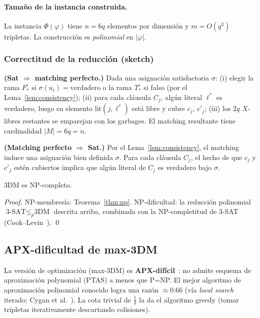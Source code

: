 \paragraph{Tamaño de la instancia construida.}
La instancia $\Phi(\varphi)$ tiene $n=6q$ elementos por dimensión y
$m=O(q^3)$ tripletas.  La construcción es \emph{polinomial} en $|\varphi|$.

\subsubsection{Correctitud de la reducción (sketch)}
\label{sec:complejidad:correctitud}

\textbf{(Sat $\Rightarrow$ matching perfecto.)}
Dada una asignación satisfactoria $\sigma$:
(i) elegir la rama $F^i_*$ si $\sigma(u_i)=\text{verdadero}$ o la rama
$T^i_*$ si falso (por el Lema~\ref{lem:consistency});
(ii) para cada cláusula $C_j$, algún literal $\ell^*$ es verdadero, luego
su elemento $\mathrm{lit}(j,\ell^*)$ está libre y cubre $c_j$, $c'_j$;
(iii) los $2q$ $X$-libres restantes se emparejan con los garbages.
El matching resultante tiene cardinalidad $|M|=6q=n$.~\checkmark

\textbf{(Matching perfecto $\Rightarrow$ Sat.)}
Por el Lema~\ref{lem:consistency}, el matching induce una asignación
bien definida $\sigma$.  Para cada cláusula $C_j$, el hecho de que $c_j$ y
$c'_j$ estén cubiertos implica que algún literal de $C_j$ es verdadero bajo
$\sigma$.~\checkmark

\begin{theorem}[3DM es NP-completo]
\label{thm:npc}
3DM es NP-completo.
\end{theorem}
\begin{proof}
NP-membresía: Teorema~\ref{thm:np}.
NP-dificultad: la reducción polinomial $\text{3-SAT}\le_p\text{3DM}$ descrita
arriba, combinada con la NP-completitud de 3-SAT (Cook--Levin~\cite{cook1971}).
\qed
\end{proof}

\subsection{APX-dificultad de max-3DM}
\label{sec:complejidad:apx}

La versión de optimización (max-3DM) es \textbf{APX-difícil}~\cite{kann1991}:
no admite esquema de aproximación polynomial (PTAS) a menos que P=NP.
El mejor algoritmo de aproximación polinomial conocido logra una razón
$\approx 0.66$ (vía \emph{local search} iterado; Cygan et al.~\cite{cygan2015}).
La cota trivial de $\tfrac{1}{3}$ la da el algoritmo greedy (tomar tripletas
iterativamente descartando colisiones).

